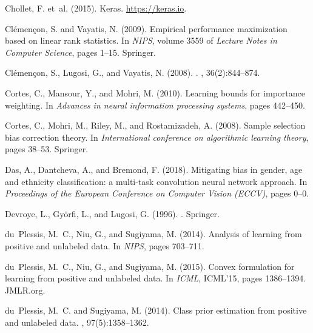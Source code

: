\documentclass[12pt]{article}
\begin{document}
\begin{thebibliography}{}
Chollet, F. et~al. (2015).
\newblock Keras.
\newblock \url{https://keras.io}.

Cl\'emen\c{c}on, S. and Vayatis, N. (2009).
\newblock Empirical performance maximization based on linear rank statistics.
\newblock In {\em NIPS}, volume 3559 of {\em Lecture Notes in Computer
  Science}, pages 1--15. Springer.

Cl{\'e}men{\c{c}}on, S., Lugosi, G., and Vayatis, N. (2008).
.
, 36(2):844--874.

Cortes, C., Mansour, Y., and Mohri, M. (2010).
\newblock Learning bounds for importance weighting.
\newblock In {\em Advances in neural information processing systems}, pages
  442--450.

Cortes, C., Mohri, M., Riley, M., and Rostamizadeh, A. (2008).
\newblock Sample selection bias correction theory.
\newblock In {\em International conference on algorithmic learning theory},
  pages 38--53. Springer.

Das, A., Dantcheva, A., and Bremond, F. (2018).
\newblock Mitigating bias in gender, age and ethnicity classification: a
  multi-task convolution neural network approach.
\newblock In {\em Proceedings of the European Conference on Computer Vision
  (ECCV)}, pages 0--0.

Devroye, L., Gy{\"o}rfi, L., and Lugosi, G. (1996).
.
\newblock Springer.

du~Plessis, M.~C., Niu, G., and Sugiyama, M. (2014).
\newblock Analysis of learning from positive and unlabeled data.
\newblock In {\em NIPS}, pages 703--711.

du~Plessis, M.~C., Niu, G., and Sugiyama, M. (2015).
\newblock Convex formulation for learning from positive and unlabeled data.
\newblock In {\em ICML}, ICML'15, pages 1386--1394. JMLR.org.

du~Plessis, M.~C. and Sugiyama, M. (2014).
\newblock Class prior estimation from positive and unlabeled data.
,
  97(5):1358--1362.


\end{thebibliography}
\end{document}
